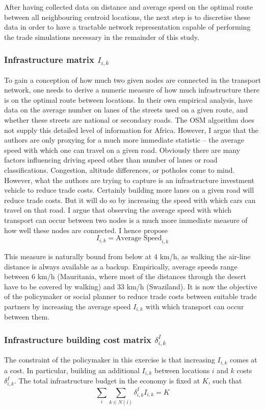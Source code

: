 \documentclass[11pt, oneside]{article}   	%
\begin{document}
After having collected data on distance and average speed on the optimal route between all neighbouring centroid locations, the next step is to discretise these data in order to have a tractable network representation capable of performing the trade simulations necessary in the remainder of this study.

\subsubsection{Infrastructure matrix $I_{i,k}$}
To gain a conception of how much two given nodes are connected in the transport network, one needs to derive a numeric measure of how much infrastructure there is on the optimal route between locations. In their own empirical analysis, \cite{fajgelbaum_optimal_2017} have data on the average number on lanes of the streets used on a given route, and whether these streets are national or secondary roads. The OSM algorithm does not supply this detailed level of information for Africa. However, I argue that the authors are only proxying for a much more immediate statistic -- the average speed with which one can travel on a given road. Obviously there are many factors influencing driving speed other than number of lanes or road classifications. Congestion, altitude differences, or potholes come to mind. However, what the authors are trying to capture is an infrastructure investment vehicle to reduce trade costs. Certainly building more lanes on a given road will reduce trade costs. But it will do so by increasing the speed with which cars can travel on that road. I argue that observing the average speed with which transport can occur between two nodes is a much more immediate measure of how well these nodes are connected. I hence propose
\begin{equation}
  I_{i,k} = \textrm{Average Speed}_{i,k}
\end{equation}

This measure is naturally bound from below at 4 km/h, as walking the air-line distance is always available as a backup. Empirically, average speeds range between 6 km/h (Mauritania, where most of the distances through the desert have to be covered by walking) and 33 km/h (Swaziland). It is now the objective of the policymaker or social planner to reduce trade costs between suitable trade partners by increasing the average speed $I_{i,k}$ with which transport can occur between them.

\subsubsection{Infrastructure building cost matrix $\delta_{i,k}^{I}$}
The constraint of the policymaker in this exercise is that increasing $I_{i,k}$ comes at a cost. In particular, building an additional $I_{i,k}$ between locations $i$ and $k$ costs $\delta_{i,k}^{I}$. The total infrastructure budget in the economy is fixed at $K$, such that
\begin{equation}
  \sum_{i}^{}\sum_{k \in N(i)}^{} \delta_{i,k}^{I}I_{i,k} = K
  \label{eq:infr_building_constraint}
\end{equation}
\end{document}
